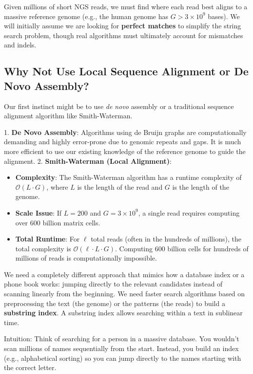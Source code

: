 Given millions of short NGS reads, we must find where each read best aligns to a massive reference genome (e.g., the human genome has $G > 3 \times 10^9$ bases). We will initially assume we are looking for \textbf{perfect matches} to simplify the string search problem, though real algorithms must ultimately account for mismatches and indels.

\subsection{Why Not Use Local Sequence Alignment or De Novo Assembly?}

Our first instinct might be to use \textit{de novo} assembly or a traditional sequence alignment algorithm like Smith-Waterman.

1. \textbf{De Novo Assembly}: Algorithms using de Bruijn graphs are computationally demanding and highly error-prone due to genomic repeats and gaps. It is much more efficient to use our existing knowledge of the reference genome to guide the alignment.
2. \textbf{Smith-Waterman (Local Alignment)}: 
\begin{itemize}
    \item \textbf{Complexity}: The Smith-Waterman algorithm has a runtime complexity of \(\mathcal{O}(L \cdot G)\), where \(L\) is the length of the read and \(G\) is the length of the genome.
    \item \textbf{Scale Issue}: If \(L = 200\) and \(G = 3 \times 10^9\), a single read requires computing over 600 billion matrix cells.
    \item \textbf{Total Runtime}: For \(\ell\) total reads (often in the hundreds of millions), the total complexity is \(\mathcal{O}(\ell \cdot L \cdot G)\). Computing 600 billion cells for hundreds of millions of reads is computationally impossible.
\end{itemize}

We need a completely different approach that mimics how a database index or a phone book works: jumping directly to the relevant candidates instead of scanning linearly from the beginning. We need faster search algorithms based on preprocessing the text (the genome) or the patterns (the reads) to build a \textbf{substring index}. A substring index allows searching within a text in sublinear time.

\sta Intuition: Think of searching for a person in a massive database. You wouldn't scan millions of names sequentially from the start. Instead, you build an index (e.g., alphabetical sorting) so you can jump directly to the names starting with the correct letter.

